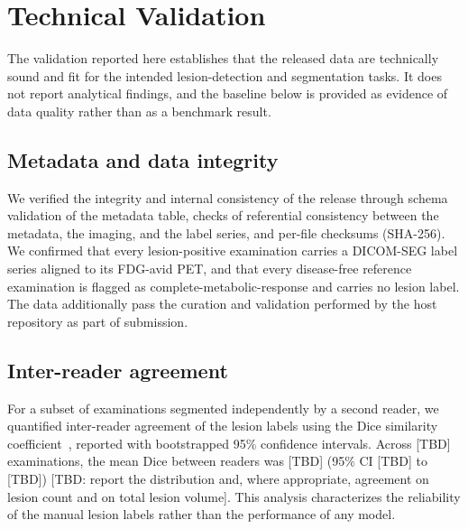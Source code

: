
\section*{Technical Validation}\label{sec:validation}

The validation reported here establishes that the released data are technically sound and fit for the intended lesion-detection and segmentation tasks.
It does not report analytical findings, and the baseline below is provided as evidence of data quality rather than as a benchmark result.

\subsection*{Metadata and data integrity}\label{subsec:integrity}
We verified the integrity and internal consistency of the release through schema validation of the metadata table, checks of referential consistency between the metadata, the imaging, and the label series, and per-file checksums (SHA-256).
We confirmed that every lesion-positive examination carries a DICOM-SEG label series aligned to its FDG-avid PET, and that every disease-free reference examination is flagged as complete-metabolic-response and carries no lesion label.
The data additionally pass the curation and validation performed by the host repository as part of submission.

\subsection*{Inter-reader agreement}\label{subsec:agreement}
For a subset of examinations segmented independently by a second reader, we quantified inter-reader agreement of the lesion labels using the Dice similarity coefficient~\cite{Dice_1945}, reported with bootstrapped 95\% confidence intervals.
Across [TBD] examinations, the mean Dice between readers was [TBD] (95\% CI [TBD] to [TBD]) [TBD: report the distribution and, where appropriate, agreement on lesion count and on total lesion volume].
This analysis characterizes the reliability of the manual lesion labels rather than the performance of any model.

